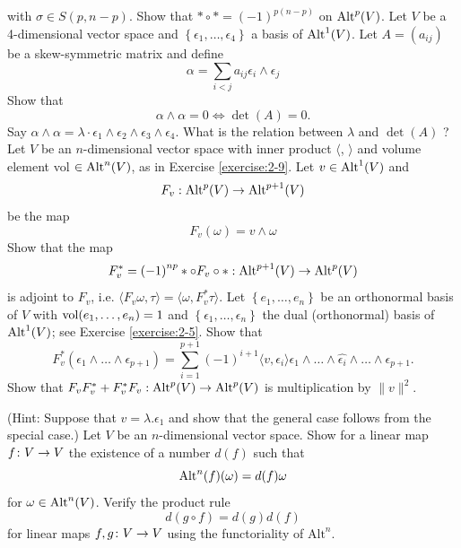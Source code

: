 \begin{enumerate}[label=\theexercise.\arabic*.,ref=\theexercise.\arabic*,leftmargin=2.7em]
\[    \]
    with $\sigma  \in  S( {p,n- p})$. Show that $*\circ *= {(-1) }^{p( {n- p}) }$ on ${\operatorname{Alt}}^{p}( V)$.
  \NewItem Let $V$ be a 4-dimensional vector space and $\left\{  {{\epsilon }_{1},\ldots,{\epsilon }_{4}}\right\}$ a
    basis of ${\operatorname{Alt}}^{1}( V)$. Let $A = ( {a}_{ij})$ be a skew-symmetric matrix and define
    \[
      \alpha  = \sum_{{i < j}}{a}_{ij}{\epsilon }_{i} \land  {\epsilon }_{j}
    \]
    Show that
    \[
      \alpha  \land  \alpha  = 0 \Leftrightarrow  \det ( A)  = 0.
    \]
    Say $\alpha  \land  \alpha  = \lambda  \cdot  {\epsilon }_{1} \land  {\epsilon }_{2} \land  {\epsilon }_{3} \land  {\epsilon }_{4}$. What is the relation between $\lambda$ and $\det ( A)$ ? Let $V$ be an $n$-dimensional vector space with inner product $\langle$, $\rangle$ and volume element vol $\in  {\operatorname{Alt}}^{n}( V)$, as in Exercise \ref{exercise:2-9}. Let $v \in  {\operatorname{Alt}}^{1}( V)$ and
    \[
      {F}_{v} : {\operatorname{Alt}}^{p}( V)  \rightarrow  {\operatorname{Alt}}^{p + 1}( V)
    \]
    be the map
    \[
      {F}_{v}( \omega )  = v \land  \omega
    \]
    Show that the map
    \[
      {F}_{v}^* = {(-1) }^{np} *  \circ  {F}_{v} \circ   *  : {\operatorname{Alt}}^{p + 1}( V)  \rightarrow  {\operatorname{Alt}}^{p}( V)
    \]
    is adjoint to ${F}_{v}$, i.e. $\langle  {{F}_{v}\omega,\tau }\rangle   = \langle  {\omega,{F}_{v}^*\tau }\rangle$.
    Let $\left\{  {{e}_{1},\ldots,{e}_{n}}\right\}$ be an orthonormal basis of $V$ with $\mathrm{vol}( {{e}_{1},\ldots,{e}_{n}}) = 1$
    and $\left\{  {{\epsilon }_{1},\ldots,{\epsilon }_{n}}\right\}$ the dual (orthonormal) basis of ${\operatorname{Alt}}^{1}( V)$;
    see Exercise \ref{exercise:2-5}. Show that
    \[
      {F}_{v}^*( {{\epsilon }_{1} \land  \ldots  \land  {\epsilon }_{p + 1}})
      = \sum_{i=1}^{p + 1}{(-1) }^{i + 1}\langle  {v,{\epsilon }_{i}}\rangle  {\epsilon }_{1}
      \land  \ldots  \land  \widehat{{\epsilon }_{i}}
      \land  \ldots  \land  {\epsilon }_{p + 1}.
    \]
    Show that ${F}_{v}{F}_{v}^* + {F}_{v}^*{F}_{v} : {\operatorname{Alt}}^{p}( V)  \rightarrow  {\operatorname{Alt}}^{p}( V)$ is multiplication
    by $\|v\|^2$. \par(Hint: Suppose that $v = \lambda.{\epsilon }_{1}$ and show that the general
    case follows from the special case.)
  \NewItem Let $V$ be an $n$-dimensional vector space. Show for a linear map $f\colon V \rightarrow  V$ the existence of a
    number $d( f)$ such that
    \[
      {\operatorname{Alt}}^{n}( f) ( \omega )  = d( f) \omega
    \]
    for $\omega  \in  {\operatorname{Alt}}^{n}( V)$. Verify the product rule
    \[
      d( {g \circ  f})  = d( g) d( f)
    \]
    for linear maps $f,g\colon V \rightarrow  V$ using the functoriality of ${\mathrm{{Alt}}}^{n}$.

\end{enumerate}
